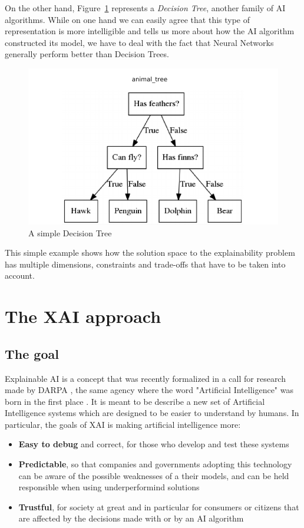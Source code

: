 \documentclass[conference]{IEEEtran}
\newcommand{\cit}{\todo[tickmarkheight=0.2cm]{cit}}
\begin{document}
On the other hand, Figure~\ref{fig:dectree} represents a \textit{Decision Tree}, another family of AI algorithms. While on one hand we can easily agree that this type of representation is more intelligible and tells us more about how the AI algorithm constructed its model, we have to deal with the fact that Neural Networks generally perform better than Decision Trees.

\begin{figure}[ht!] \centering \includegraphics[width=0.9\linewidth]{images/dectree}
    \caption{A simple Decision Tree} \label{fig:dectree} \end{figure}

This simple example shows how the solution space to the explainability problem has multiple dimensions, constraints and trade-offs that have to be taken into account.

\section{The XAI approach}
\label{sec:xai}

\subsection{The goal}

Explainable AI is a concept that was recently formalized in a call for research made by DARPA \cit, the same agency where the word "Artificial
Intelligence" was born in the first place \cit. It is meant to be describe a new set
of Artificial Intelligence systems which are designed to be easier to understand
by humans. In particular, the goals of XAI is making artificial intelligence
more:

\begin{itemize}
    \item \textbf{Easy to debug} and correct, for those who develop and test these systems
    \item \textbf{Predictable}, so that companies and governments adopting this technology can be aware of the possible weaknesses of a their models, and can be held responsible when using underperformind solutions
    \item \textbf{Trustful}, for society at great and in particular for consumers or citizens that are affected by the decisions made with or by an AI algorithm
\end{itemize}
\end{document}
